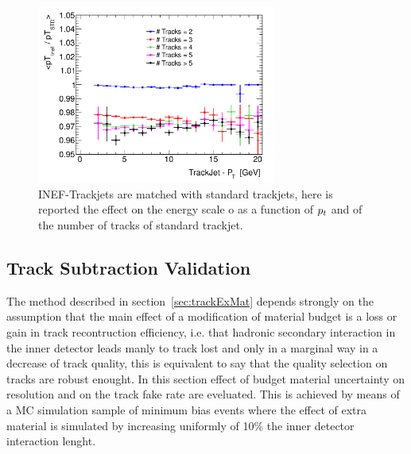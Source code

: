 \begin{figure}[tp]
\centering
\includegraphics[width=0.7\textwidth]{figure/trackjet/T7/Sys_pt_nTrack.pdf}
\caption{INEF-Trackjets are matched with standard trackjets, here is reported the effect on the energy scale o
	as a function of $p_{t}$ and of the number of tracks of standard trackjet.} 

\label{fig:inef_tj_std_scale}
\end{figure}    


\subsection{Track Subtraction Validation} %
\label{sec:valid}
The method described in section~\ref{sec:trackExMat} depends strongly on the assumption that the main effect of 
a modification of material budget is a loss or gain in track recontruction efficiency, i.e. that hadronic secondary
interaction in the inner detector leads manly to track lost and only in a marginal way in a decrease of track quality,
this is equivalent to say that the quality selection on tracks are robust enought.
In this section effect of budget material uncertainty on resolution and on the track fake rate are eveluated.
This is achieved by means of a MC simulation sample of minimum bias events where the effect of extra material is simulated
by increasing uniformly of 10\% the inner detector interaction lenght.  

